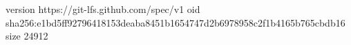 version https://git-lfs.github.com/spec/v1
oid sha256:e1bd5ff92796418153deaba8451b1654747d2b6978958c2f1b4165b765cbdb16
size 24912
